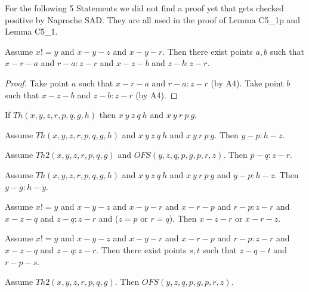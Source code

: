\documentclass{article}
\begin{document}
  For the following 5 Statements we did not find a proof yet that gets checked positive by Naproche SAD. They are all used in the proof of Lemma C5_1p and Lemma C5_1.

  \begin{forthel}
    \begin{lemma}[C5_1f]
      Assume $x != y$ and $x-y-z$ and $x-y-r$. Then there exist points $a,b$ such that $x-r-a$ and $r-a : z-r$ and $x-z-b$ and $z-b : z-r$.
    \end{lemma}
    \begin{proof}
    	Take point $a$ such that $x-r-a$ and $r-a : z-r$ (by A4).	Take point $b$ such that $x-z-b$ and $z-b : z-r$ (by A4).
    \end{proof}

    \begin{axiom}[C5_1g]
      If $Th(x,y,z,r,p,q,g,h)$ then $x~y~z~q~h$ and $x~y~r~p~g$.
    \end{axiom}

    \begin{axiom}[C5_1h]
      Assume $Th(x,y,z,r,p,q,g,h)$ and $x~y~z~q~h$ and $x~y~r~p~g$. Then $y-p : h-z$.
    \end{axiom}

    \begin{axiom}[C5_1i]
      Assume $Th2(x,y,z,r,p,q,g)$ and $OFS(y,z,q,p,g,p,r,z)$. Then $p-q : z-r$.
    \end{axiom}

    \begin{axiom}[C5_1j]
      Assume $Th(x,y,z,r,p,q,g,h)$ and $x~y~z~q~h$ and $x~y~r~p~g$ and $y-p : h-z$. Then $y-g : h-y$.
    \end{axiom}



    \begin{lemma}[C5_1k]
      Assume $x != y$ and $x-y-z$ and $x-y-r$ and $x-r-p$ and $r-p : z-r$ and $x-z-q$ and $z-q : z-r$ and ($z = p$ or $r = q$). Then $x-z-r$ or $x-r-z$.
    \end{lemma}

    \begin{lemma}[C5_1l]
      Assume $x != y$ and $x-y-z$ and $x-y-r$ and $x-r-p$ and $r-p : z-r$ and $x-z-q$ and $z-q : z-r$. Then there exist points $s,t$ such that $z-q-t$ and $r-p-s$.
    \end{lemma}

    \begin{lemma}[C5_1m]
      Assume $Th2(x,y,z,r,p,q,g)$. Then $OFS(y,z,q,p,g,p,r,z)$.
    \end{lemma}


\end{forthel}
\end{document}

